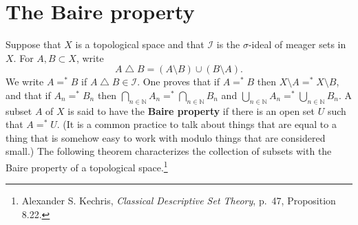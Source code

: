 \documentclass{article}
\theoremstyle{definition}
\theoremstyle{definition}
\begin{document}
\section{The Baire property}
Suppose that $X$ is a topological space and that $\mathscr{I}$ is the $\sigma$-ideal of meager sets in $X$. 
For $A,B \subset X$, write
\[
A \bigtriangleup B =(A \setminus B) \cup (B \setminus A).
\]
We write $A=^* B$ if $A \bigtriangleup B \in \mathscr{I}$.
One proves that if $A=^* B$ then $X \setminus A =^* X \setminus B$, and that if
$A_n=^* B_n$ then $\bigcap_{n \in \mathbb{N}} A_n =^* \bigcap_{n \in \mathbb{N}} B_n$ and
$\bigcup_{n \in \mathbb{N}} A_n =^* \bigcup_{n \in \mathbb{N}} B_n$.
A subset $A$ of $X$ is said to have the \textbf{Baire property} if
there is an open set $U$ such that $A=^* U$. (It is a common practice to talk about things that are equal to a thing that is somehow easy to work with
modulo things that are considered small.) The following theorem characterizes the collection of subsets with the Baire property of a topological space.\footnote{Alexander S. Kechris, {\em Classical Descriptive Set Theory}, p.~47, Proposition 8.22.}
\end{document}
